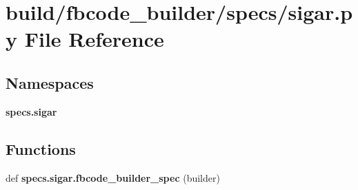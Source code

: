 \section{build/fbcode\+\_\+builder/specs/sigar.py File Reference}
\label{sigar_8py}
\subsection*{Namespaces}
\begin{DoxyCompactItemize}
\item 
 {\bf specs.\+sigar}
\end{DoxyCompactItemize}
\subsection*{Functions}
\begin{DoxyCompactItemize}
\item 
def {\bf specs.\+sigar.\+fbcode\+\_\+builder\+\_\+spec} (builder)
\end{DoxyCompactItemize}
